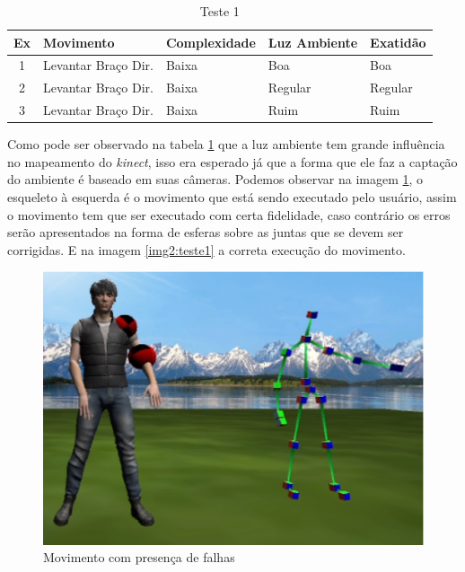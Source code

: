 \begin{table}[H]
\centering
\caption{Teste 1}
\label{tab:teste1}
\begin{tabular}{@{}|c|c|l|l|l|@{}}
\toprule
\multicolumn{1}{|l|}{\textbf{Ex}} & \multicolumn{1}{l|}{\textbf{Movimento}} & \textbf{Complexidade} & \textbf{Luz Ambiente} & \textbf{Exatidão} \\ \midrule
1                                 & Levantar Braço Dir.                     & Baixa                 & Boa                   & Boa               \\ \midrule
2                                 & Levantar Braço Dir.                     & Baixa                 & Regular               & Regular           \\ \midrule
3                                 & Levantar Braço Dir.                     & Baixa                 & Ruim                  & Ruim              \\ \bottomrule
\end{tabular}
\end{table}

  Como pode ser observado na tabela \ref{tab:teste1} que a luz ambiente tem grande influência no mapeamento do \textit{kinect}, isso era esperado
já que a forma que ele faz a captação do ambiente é baseado em suas câmeras. Podemos observar na imagem \ref{img:teste1}, o esqueleto à esquerda é o movimento
que está sendo executado pelo usuário, assim o movimento tem que ser executado
com certa fidelidade, caso contrário os erros serão apresentados na forma de esferas sobre as juntas que se devem ser corrigidas. E na imagem \ref{img2:teste1} a correta execução do movimento.

\begin{figure}[H]
\centering
\includegraphics [keepaspectratio=true,scale=0.60]{figuras/img2teste1.eps}
\caption{Movimento com presença de falhas}
\label{img:teste1}
\end{figure}

